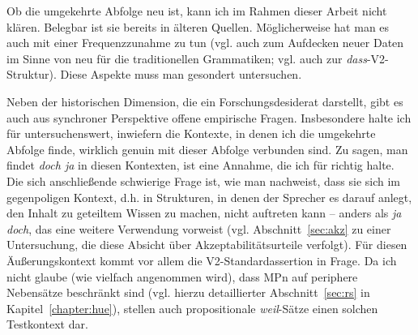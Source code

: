 Ob die umgekehrte Abfolge neu ist, kann ich im Rahmen dieser Arbeit nicht klären. Belegbar ist sie bereits in älteren Quellen. Möglicherweise hat man es auch mit einer Frequenzzunahme zu tun (vgl. auch \citealt[2]{Imo2010} zum Aufdecken \glqq neuer\grqq{} Daten im Sinne von \glqq neu für die traditionellen Grammatiken\grqq{}; vgl. auch \citealt[279]{Freywald2008} zur \textit{dass}-V2-Struktur). Diese Aspekte muss man gesondert untersuchen. 

Neben der historischen Dimension, die ein Forschungsdesiderat darstellt, gibt es auch aus synchroner Perspektive offene empirische Fragen. Insbesondere halte ich für untersuchenswert, inwiefern die Kontexte, in denen ich die umgekehr\-te Abfolge finde, wirklich genuin mit dieser Abfolge verbunden sind. Zu sagen, man findet \textit{doch ja} in diesen Kontexten, ist eine Annahme, die ich für richtig halte. Die sich anschließende schwierige Frage ist, wie man nachweist, dass sie sich im gegenpoligen Kontext, d.h. in Strukturen, in denen der Sprecher es darauf anlegt, den Inhalt zu geteiltem Wissen zu machen, nicht auftreten kann – anders als \textit{ja doch}, das eine weitere Verwendung vorweist (vgl. Abschnitt~\ref{sec:akz} zu einer Untersuchung, die diese Absicht über Akzeptabilitätsurteile verfolgt). Für diesen Äußerungskontext kommt vor allem die V2-Standardassertion in Frage. Da ich nicht glaube (wie vielfach angenommen wird), dass MPn auf periphere Nebensätze beschränkt sind (vgl. hierzu detaillierter Abschnitt~\ref{sec:rs} in Kapitel~\ref{chapter:hue}), stellen auch propositionale \textit{weil}-Sätze einen solchen Testkontext dar.


